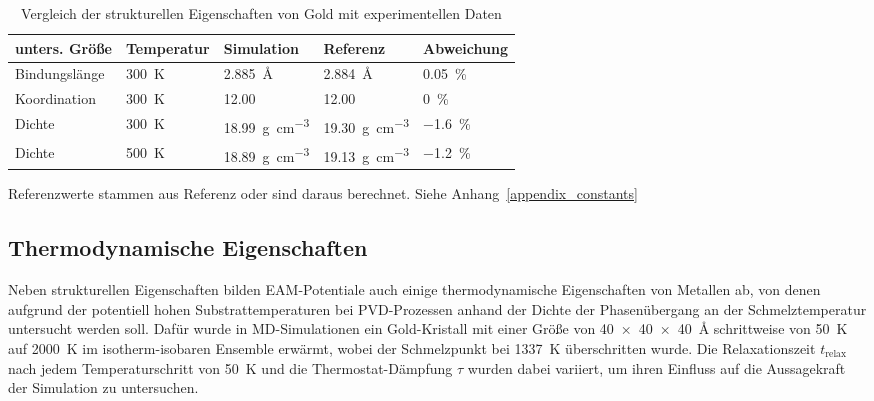 \begin{table}[hbt]
  \begin{threeparttable}
  \oddrowcolors
  \caption{Vergleich der strukturellen Eigenschaften von Gold mit experimentellen Daten}
  \label{tab:goldpreresults}
  \begin{tabularx}{\textwidth}{|lXXXX|}
    \hline
    \textbf{unters. Größe} & \textbf{Temperatur} & \textbf{Simulation}                     & \textbf{Referenz}\tnote{a}              & \textbf{Abweichung} \\
    \hline
    Bindungslänge          & \SI{300}{\kelvin}   & \SI{2.885}{\angstrom}                   & \SI{2.884}{\angstrom}                   & \SI{0.05}{\percent} \\
    Koordination           & \SI{300}{\kelvin}   & \SI{12.00}{}                            & \SI{12.00}{}                            & \SI{0}{\percent}    \\
    Dichte                 & \SI{300}{\kelvin}   & \SI{18.99}{\gram\per\cubic\centi\meter} & \SI{19.30}{\gram\per\cubic\centi\meter} & \SI{-1.6}{\percent} \\
    Dichte                 & \SI{500}{\kelvin}   & \SI{18.89}{\gram\per\cubic\centi\meter} & \SI{19.13}{\gram\per\cubic\centi\meter} & \SI{-1.2}{\percent} \\
    \hline
  \end{tabularx}
  \begin{tablenotes}
    \item[a] Referenzwerte stammen aus Referenz\cite{haynes_crc_2011} oder sind daraus berechnet.
      Siehe Anhang~\ref{appendix_constants}
  \end{tablenotes}
  \end{threeparttable}
\end{table}

\subsection{Thermodynamische Eigenschaften}
\label{goldthermo}

Neben strukturellen Eigenschaften bilden EAM-Potentiale auch einige thermodynamische Eigenschaften von Metallen ab, von denen aufgrund der potentiell hohen Substrattemperaturen bei PVD-Prozessen\cite{gottsche_uber_1956} anhand der Dichte der Phasenübergang an der Schmelztemperatur untersucht werden soll.
Dafür wurde in MD-Simulationen ein Gold-Kristall mit einer Größe von \SI{40x40x40}{\angstrom} schrittweise von \SI{50}{\kelvin} auf \SI{2000}{\kelvin} im isotherm-isobaren Ensemble erwärmt, wobei der Schmelzpunkt bei \SI{1337}{\kelvin}\cite{haynes_crc_2011} überschritten wurde.
Die Relaxationszeit $t_\text{relax}$ nach jedem Temperaturschritt von \SI{50}{\kelvin} und die Thermostat-Dämpfung $\tau$ wurden dabei variiert, um ihren Einfluss auf die Aussagekraft der Simulation zu untersuchen.

